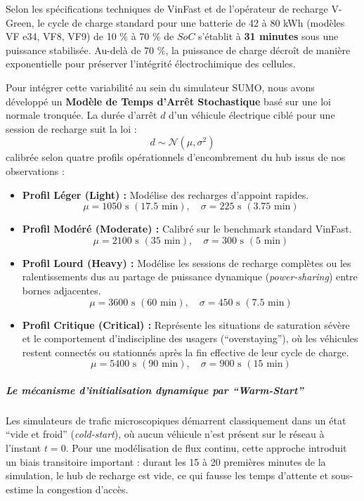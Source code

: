 \documentclass[10pt, a4paper]{article}
\providecommand{\tightlist}{}
\begin{document}
Selon les spécifications techniques de VinFast et de l'opérateur de
recharge V-Green, le cycle de charge standard pour une batterie de 42 à
80 kWh (modèles VF e34, VF8, VF9) de 10 \% à 70 \% de \(SoC\) s'établit
à \textbf{31 minutes} sous une puissance stabilisée. Au-delà de 70 \%,
la puissance de charge décroît de manière exponentielle pour préserver
l'intégrité électrochimique des cellules.

Pour intégrer cette variabilité au sein du simulateur SUMO, nous avons
développé un \textbf{Modèle de Temps d'Arrêt Stochastique} basé sur une
loi normale tronquée. La durée d'arrêt \(d\) d'un véhicule électrique
ciblé pour une session de recharge suit la loi :
\[d \sim \mathcal{N}(\mu, \sigma^2)\] calibrée selon quatre profils
opérationnels d'encombrement du hub issus de nos observations :

\begin{itemize}
\tightlist
\item
  \textbf{Profil Léger (Light) :} Modélise des recharges d'appoint
  rapides.
  \[\mu = 1050 \text{ s } (17.5 \text{ min}), \quad \sigma = 225 \text{ s } (3.75 \text{ min})\]
\item
  \textbf{Profil Modéré (Moderate) :} Calibré sur le benchmark standard
  VinFast.
  \[\mu = 2100 \text{ s } (35 \text{ min}), \quad \sigma = 300 \text{ s } (5 \text{ min})\]
\item
  \textbf{Profil Lourd (Heavy) :} Modélise les sessions de recharge
  complètes ou les ralentissements dus au partage de puissance dynamique
  (\emph{power-sharing}) entre bornes adjacentes.
  \[\mu = 3600 \text{ s } (60 \text{ min}), \quad \sigma = 450 \text{ s } (7.5 \text{ min})\]
\item
  \textbf{Profil Critique (Critical) :} Représente les situations de
  saturation sévère et le comportement d'indiscipline des usagers
  (``overstaying''), où les véhicules restent connectés ou stationnés
  après la fin effective de leur cycle de charge.
  \[\mu = 5400 \text{ s } (90 \text{ min}), \quad \sigma = 900 \text{ s } (15 \text{ min})\]
\end{itemize}

\subparagraph{Le mécanisme d'initialisation dynamique par
``Warm-Start''}\label{le-muxe9canisme-dinitialisation-dynamique-par-warm-start}

Les simulateurs de trafic microscopiques démarrent classiquement dans un
état ``vide et froid'' (\emph{cold-start}), où aucun véhicule n'est
présent sur le réseau à l'instant \(t = 0\). Pour une modélisation de
flux continu, cette approche introduit un biais transitoire important :
durant les 15 à 20 premières minutes de la simulation, le hub de
recharge est vide, ce qui fausse les temps d'attente et sous-estime la
congestion d'accès.
\end{document}
